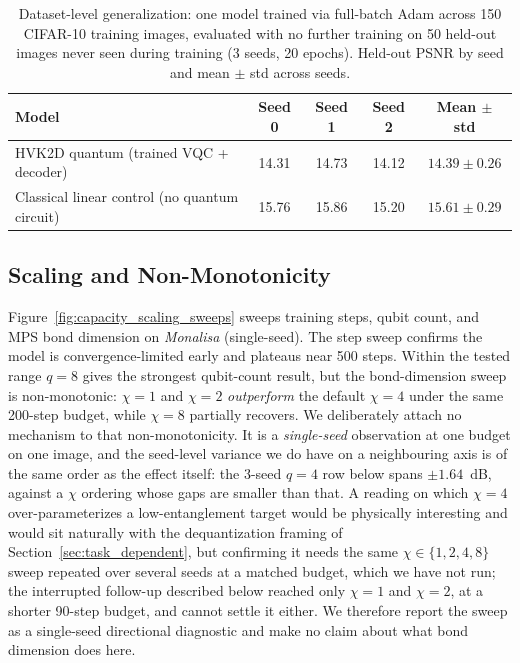 \documentclass[11pt]{article}
\begin{document}
\begin{table}[H]
\centering
\caption{Dataset-level generalization: one model trained via full-batch Adam across 150 CIFAR-10 training images, evaluated with no further training on 50 held-out images never seen during training (3 seeds, 20 epochs). Held-out PSNR by seed and mean $\pm$ std across seeds.}
\label{tab:dataset_level_generalization}
\scriptsize
\begin{tabular}{lcccc}
\toprule
Model & Seed 0 & Seed 1 & Seed 2 & Mean $\pm$ std \\
\midrule
HVK2D quantum (trained VQC + decoder) & 14.31 & 14.73 & 14.12 & $14.39\pm0.26$ \\
Classical linear control (no quantum circuit) & 15.76 & 15.86 & 15.20 & $15.61\pm0.29$ \\
\bottomrule
\end{tabular}
\end{table}

\subsection{Scaling and Non-Monotonicity}
Figure~\ref{fig:capacity_scaling_sweeps} sweeps training steps, qubit count, and MPS bond dimension on \textit{Monalisa} (single-seed). The step sweep confirms the model is convergence-limited early and plateaus near 500 steps. Within the tested range $q=8$ gives the strongest qubit-count result, but the bond-dimension sweep is non-monotonic: $\chi=1$ and $\chi=2$ \emph{outperform} the default $\chi=4$ under the same 200-step budget, while $\chi=8$ partially recovers. We deliberately attach no mechanism to that non-monotonicity. It is a \emph{single-seed} observation at one budget on one image, and the seed-level variance we do have on a neighbouring axis is of the same order as the effect itself: the 3-seed $q=4$ row below spans $\pm1.64$~dB, against a $\chi$ ordering whose gaps are smaller than that. A reading on which $\chi=4$ over-parameterizes a low-entanglement target would be physically interesting and would sit naturally with the dequantization framing of Section~\ref{sec:task_dependent}, but confirming it needs the same $\chi\in\{1,2,4,8\}$ sweep repeated over several seeds at a matched budget, which we have not run; the interrupted follow-up described below reached only $\chi=1$ and $\chi=2$, at a shorter 90-step budget, and cannot settle it either. We therefore report the sweep as a single-seed directional diagnostic and make no claim about what bond dimension does here.
\end{document}
